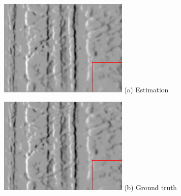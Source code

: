 \begin{figure}[h]
  \begin{minipage}[t]{0.48\textwidth}
    \centering \includegraphics[width =
    \textwidth]{images/slider_estimation.png}
    \label{subfig:estimation}
    (a) Estimation
  \end{minipage}
  \hfill
  \begin{minipage}[t]{0.48\textwidth}
    \centering \includegraphics[width =
    \textwidth]{images/slider_groundtruth.png}
    \label{subfig:groundtruth}
    (b) Ground truth
  \end{minipage}
  \hfill


\end{figure}
